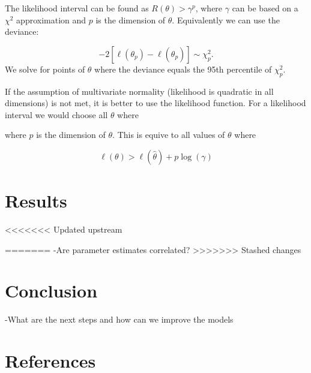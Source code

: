 \documentclass[11pt,preprint, authoryear]{elsarticle}
\numberwithin{equation}{section}
\numberwithin{figure}{section}
\numberwithin{table}{section}
\begin{document}
The likelihood interval can be found as \(R(\theta) > \gamma^p\), where
\(\gamma\) can be based on a \(\chi^2\) approximation and \(p\) is the
dimension of \(\theta\). Equivalently we can use the deviance:

\[ -2[\ell(\theta_p) - \ell(\hat{\theta_p})] \sim \chi^2_p. \] We solve
for points of \(\theta\) where the deviance equals the 95th percentile
of \(\chi^2_p\).

If the assumption of multivariate normality (likelihood is quadratic in
all dimensions) is not met, it is better to use the likelihood function.
For a likelihood interval we would choose all \(\theta\) where

where \(p\) is the dimension of \(\theta\). This is equive to all values
of \(\theta\) where

\[\ell(\theta) > \ell(\hat{\theta}) + p \log(\gamma)\]

\section{Results}\label{results}

\textless{}\textless{}\textless{}\textless{}\textless{}\textless{}\textless{}
Updated upstream

======= -Are parameter estimates correlated?
\textgreater{}\textgreater{}\textgreater{}\textgreater{}\textgreater{}\textgreater{}\textgreater{}
Stashed changes

\section{Conclusion}\label{conclusion}

-What are the next steps and how can we improve the models

\section{References}\label{references}

\newpage
\nocite{*}

\end{document}
